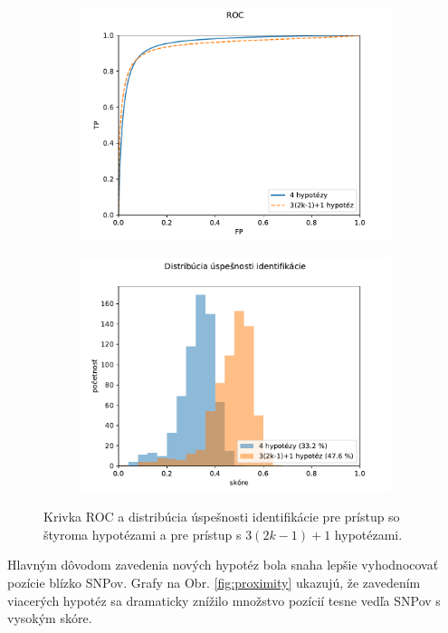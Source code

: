 \begin{figure}[t]
\begin{subfigure}{0.5\textwidth}
\centerline{\includegraphics[width=\linewidth]{plots/1_ROC}}
\end{subfigure}%
\begin{subfigure}{0.5\textwidth}
\centerline{\includegraphics[width=\linewidth]{plots/1_uspesnost_eqbins}}
\end{subfigure}
\caption{Krivka ROC a distribúcia úspešnosti identifikácie pre prístup so štyroma hypotézami a pre prístup s $3(2k-1)+1$ hypotézami.}
\label{fig:grafy_4vsMany}
\end{figure}

Hlavným dôvodom zavedenia nových hypotéz bola snaha lepšie vyhodnocovať pozície blízko SNPov. 
Grafy na Obr. \ref{fig:proximity} ukazujú, že zavedením viacerých hypotéz sa dramaticky znížilo množstvo pozícií tesne vedľa SNPov s
vysokým skóre.

